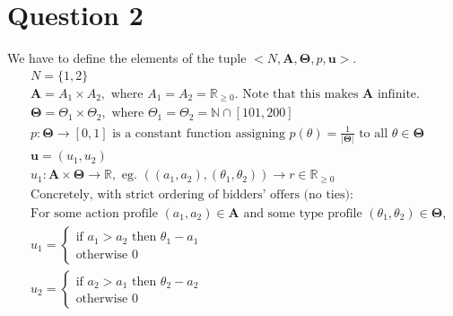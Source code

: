 \documentclass[10pt,a4paper]{article}
\begin{document}
\section*{Question 2}
We have to define the elements of the tuple $<N,\bm{A},\bm{\Theta},p,\bm{u}>$.
\begin{align*}
&N=\{1,2\} \\
&\bm{A}=A_1\times A_2, \text{ where $A_1=A_2=\mathbb{R}_{\geq 0}$}\text{. Note that this makes $\bm{A}$ infinite.}\\
&\bm{\Theta}=\Theta_1 \times \Theta_2, \text{ where $\Theta_1=\Theta_2= \mathbb{N}\cap [101,200]$}\\
&p: \bm{\Theta} \rightarrow [0,1] \text{ is a constant function assigning $p(\theta)=\tfrac{1}{|\bm{\Theta}|}$ to all $\theta \in \bm{\Theta}$}\\
&\bm{u}=(u_1,u_2)\\
&u_1:\bm{A}\times \bm{\Theta} \rightarrow \mathbb{R},\text{ eg. $((a_1,a_2),(\theta_1, \theta_2))\rightarrow r\in \mathbb{R}_{\geq 0}$}\\
&\text{Concretely, with strict ordering of bidders' offers (no ties):}\\
&\text{For some action profile $(a_1,a_2)\in\bm{A}$ and some type profile $(\theta_1,\theta_2)\in \bm{\Theta}$,}\\
&u_1=\begin{cases}
\text{if } a_1>a_2 \text{ then }\theta_1-a_1 \\
\text{otherwise } 0
\end{cases}\\
&u_2=\begin{cases}
\text{if } a_2>a_1 \text{ then }\theta_2-a_2 \\
\text{otherwise } 0
\end{cases}
\end{align*}
\end{document}
